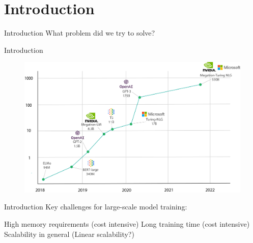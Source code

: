 \section{Introduction}

\begin{frame}{Introduction}
    What problem did we try to solve?
\end{frame}

\begin{frame}{Introduction}
    \begin{center}
        \begin{figure}[H]
            \includegraphics[scale=.4]{figures/introduction/large_models.png}
        \end{figure}
    \end{center}
\end{frame}

\begin{frame}{Introduction}
    Key challenges for large-scale model training:

    \begin{center}
        \begin{itemize}
            \bitem High memory requirements (cost intensive)
            \bitem Long training time  (cost intensive)
            \bitem Scalability in general (Linear scalability?)
        \end{itemize}
    \end{center}
\end{frame}

